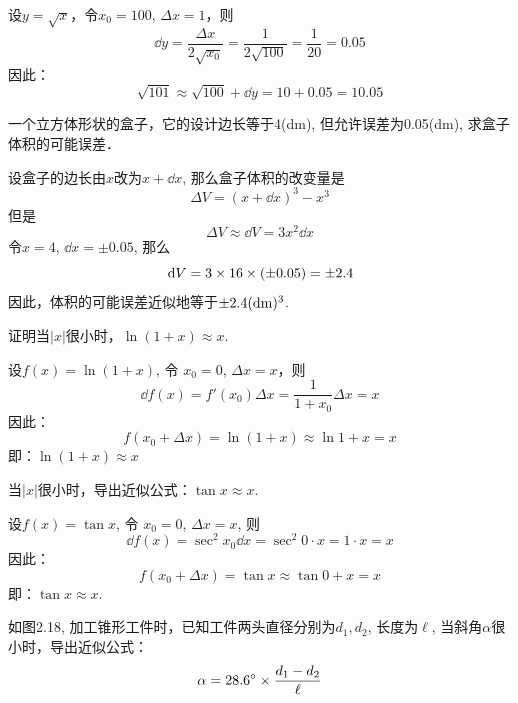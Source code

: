 \begin{solution}
设$y=\sqrt{x}$，令$x_0=100$, $\Delta x=1$，则
\[\dd y=\frac{\Delta x}{2\sqrt{x_0}}=\frac{1}{2\sqrt{100}}=\frac{1}{20}=0.05\]
因此：
\[\sqrt{101}\approx \sqrt{100}+\dd y=10+0.05=10.05\]
\end{solution}



\begin{example}
一个立方体形状的盒子，它的设计边长等于4(dm), 但允许误差为0.05(dm), 求盒子体积的可能误差．
\end{example}


\begin{solution}
设盒子的边长由$x$改为$x+\dd x$, 那么盒子体积的改变量是
\[\Delta V= (x+\dd x)^3-x^3\]
但是
\[\Delta V\approx \dd V=3x^2\dd x\]
令$x=4$, $\dd x=\pm 0.05$, 那么
\[\,{\rm d} V=3\times16\times (\pm 0. 05) =\pm 2.4\]
因此，体积的可能误差近似地等于$\pm 2.4({\rm dm})^3$.
\end{solution}

\begin{example}
    证明当$|x|$很小时，$\ln(1+x)\approx x$.
\end{example}

\begin{solution}
    设$f(x)=\ln(1+x)$, 令 $x_0=0$, $\Delta x=x$，则
\[\dd f (x) =f' (x_0) \Delta x=\frac{1}{1+x_0}\Delta x=x\]
因此：
\[f (x_0+\Delta x) =\ln (1+x) \approx \ln 1+x=x\]
即：$\ln(1+x)\approx x$
\end{solution}


\begin{example}
    当$|x|$很小时，导出近似公式：$\tan x\approx x$.
\end{example}


\begin{solution}
    设$f(x)=\tan x$, 令 $x_0=0$, $\Delta x=x$, 则
\[\dd f (x) =\sec^2x_0 \dd x=\sec^2 0\cdot x=1\cdot x=x\]
因此：
\[f (x_0+\Delta x) =\tan x\approx \tan 0+x=x\]
即：$\tan x\approx x$.
\end{solution}

\begin{example}
如图2.18, 加工锥形工件时，已知工件两头直径分别为$d_1,d_2$, 长度为$\ell$, 当斜角$\alpha$很小时，导出近似公式：
\[\alpha=28.6^{\circ}\times\dfrac{d_1-d_2}{\ell}\]
\end{example}

\begin{figure}[htp]
    \centering
{}  
    \caption{}
\end{figure}

